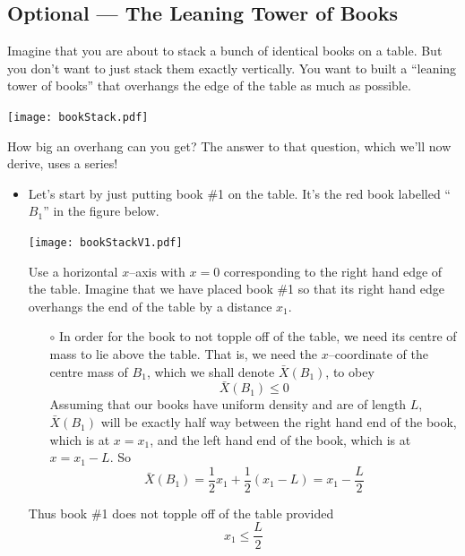 \subsection{Optional --- The Leaning Tower of Books}\label{sec:Stack}
Imagine that you are about to stack a bunch of identical books on a
table. But you don't want to just stack them exactly vertically.
You want to built a ``leaning tower of books'' that overhangs the
edge of the table as much as possible.
\begin{efig}
\begin{center}
     \texttt{[image: bookStack.pdf]}
\end{center}
\end{efig}
How big an overhang can you get? The answer to that question, which we'll now
derive, uses a series!
\begin{itemize}
\item
Let's start by just putting book \#1 on the table. It's the red book
labelled ``$B_1$'' in the figure below.
\begin{efig}
\begin{center}
     \texttt{[image: bookStackV1.pdf]}
\end{center}
\end{efig}
Use a horizontal $x$--axis with $x=0$ corresponding to the right hand
edge of the table. Imagine that we have placed book \#1 so that its
right hand edge overhangs the end of the table by a distance $x_1$.
\begin{itemize}\itemsep1pt \parskip0pt  \itemindent-10pt
\item[$\circ$]
In order for the book to not topple off of the table, we need its
centre of mass to lie above the table. That is, we need the $x$--coordinate
of the centre mass of $B_1$, which we shall denote $\bar X(B_1)$, to obey
\begin{equation*}
\bar X(B_1) \le 0
\end{equation*}
Assuming that our books have uniform density and are of length
$L$, $\bar X(B_1)$ will be exactly half way between the right hand end of the
book, which is at $x=x_1$, and the left hand end of the book, which is at
$x=x_1-L$. So
\begin{equation*}
\bar X(B_1) =\frac{1}{2} x_1+\frac{1}{2}(x_1-L)
            = x_1-\frac{L}{2}
\end{equation*}
\end{itemize}
Thus book \#1 does not topple off of the table provided
\begin{equation*}
x_1\le\frac{L}{2}
\end{equation*}


\end{itemize}
